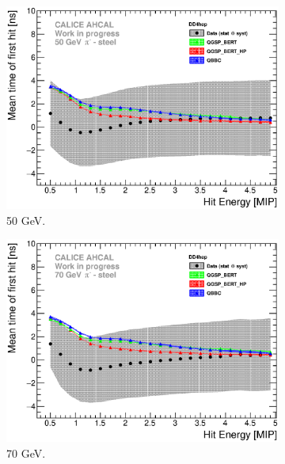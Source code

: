 \begin{figure}[htbp!]
  \begin{subfigure}[t]{0.49\textwidth}
    \centering
    \includegraphics[width=1\textwidth]{../Thesis_Plots/Timing/Pions/Plots/ComparisonToSim/Time_Energy_50GeV_DD4hep.eps}
    \caption{50 GeV.} \label{fig:Energy_SimData_50GeV_DD4hep}
  \end{subfigure}
  \hfill
  \begin{subfigure}[t]{0.49\textwidth}
    \centering
    \includegraphics[width=1\textwidth]{../Thesis_Plots/Timing/Pions/Plots/ComparisonToSim/Time_Energy_70GeV_DD4hep.eps}
    \caption{70 GeV.} \label{fig:Energy_SimData_70GeV_DD4hep}
  \end{subfigure}
  \hfill
  \begin{subfigure}[t]{0.49\textwidth}

\end{subfigure}
\end{figure}

